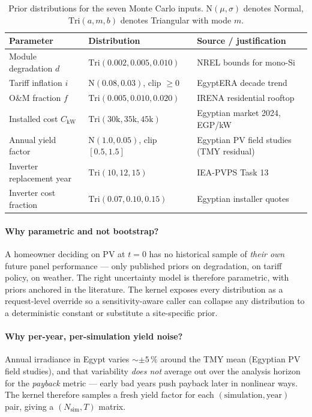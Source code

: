 \begin{table}[!htbp]
\centering
\footnotesize
\setlength{\tabcolsep}{4pt}
\renewcommand{\arraystretch}{1.2}
\begin{tabularx}{\linewidth}{@{}p{3.2cm} l X@{}}
\toprule
\textbf{Parameter} & \textbf{Distribution} & \textbf{Source / justification} \\
\midrule
Module degradation $d$
  & $\mathrm{Tri}(0.002, 0.005, 0.010)$
  & NREL bounds for mono-Si \citep{jordan2013} \\
Tariff inflation $i$
  & $\mathrm{N}(0.08, 0.03)$, clip $\ge 0$
  & EgyptERA decade trend \citep{egyptera_tariff} \\
O\&M fraction $f$
  & $\mathrm{Tri}(0.005, 0.010, 0.020)$
  & IRENA residential rooftop \citep{irena2023} \\
Installed cost $C_{\text{kW}}$
  & $\mathrm{Tri}(30\text{k}, 35\text{k}, 45\text{k})$
  & Egyptian market 2024, EGP/kW \\
Annual yield factor
  & $\mathrm{N}(1.0, 0.05)$, clip $[0.5, 1.5]$
  & Egyptian PV field studies (TMY residual) \\
Inverter replacement year
  & $\mathrm{Tri}(10, 12, 15)$
  & IEA-PVPS Task 13 \citep{ieapvps2021} \\
Inverter cost fraction
  & $\mathrm{Tri}(0.07, 0.10, 0.15)$
  & Egyptian installer quotes \\
\bottomrule
\end{tabularx}
\caption{Prior distributions for the seven Monte Carlo inputs.
$\mathrm{N}(\mu,\sigma)$ denotes Normal, $\mathrm{Tri}(a,m,b)$
denotes Triangular with mode $m$.}
\label{tab:priors}
\end{table}

\paragraph{Why parametric and not bootstrap?}
A homeowner deciding on PV at $t = 0$ has no historical sample of
\emph{their own} future panel performance --- only published priors
on degradation, on tariff policy, on weather. The right uncertainty
model is therefore parametric, with priors anchored in the
literature. The kernel exposes every distribution as a request-level
override so a sensitivity-aware caller can collapse any distribution
to a deterministic constant or substitute a site-specific prior.

\paragraph{Why per-year, per-simulation yield noise?}
Annual irradiance in Egypt varies ${\sim}\pm 5\,\%$ around the TMY
mean (Egyptian PV field studies), and that variability \emph{does
not} average out over the analysis horizon for the \emph{payback}
metric --- early bad years push payback later in nonlinear ways. The
kernel therefore samples a fresh yield factor for each
$(\text{simulation}, \text{year})$ pair, giving a
$(N_{\text{sim}}, T)$ matrix.

